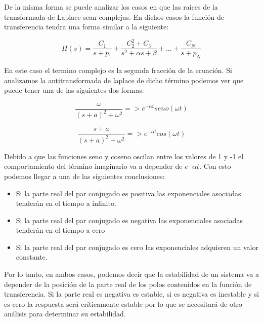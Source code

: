 De la misma forma se puede analizar los casos en que las raices de la transformada de Laplace sean complejas. En dichos casos la función de transferencia tendra una forma similar a la siguiente:

\begin{equation}
H(s)=\frac{C_1}{s+p_1}+\frac{C_2^2+C_3}{s^2+\alpha s+\beta}+...+\frac{C_N}{s+p_N}
\end{equation}

En este caso el termino complejo es la segunda fracción de la ecuación. Si analizamos la antitransformada de laplace de dicho término podemos ver que puede tener una de las siguientes dos formas:

\begin{equation}
\frac{\omega}{(s+a)^2+{\omega}^2} => e^{-\alpha t}seno(\omega t)
\end{equation}

\begin{equation}
\frac{s+a}{(s+a)^2+{\omega}^2} => e^{-\alpha t}cos(\omega t)
\end{equation}

Debido a que las funciones seno y coseno oscilan entre los valores de 1 y -1 el comportamiento del término imaginario va a depender de $e^-{\alpha t}$. Con esto podemos llegar a una de las siguientes conclusiones:

\begin{itemize}
\item Si la parte real del par conjugado es positiva las exponenciales asociadas tenderán en el tiempo a infinito.
\item Si la parte real del par conjugado es negativa las exponenciales asociadas tenderán en el tiempo a cero
\item Si la parte real del par conjugado es cero las exponenciales adquieren un valor constante.
\end{itemize}

Por lo tanto, en ambos casos, podemos decir que la estabilidad de un sistema va a depender de la posición de la parte real de los polos contenidos en la función de transferencia. Si la parte real es negativa es estable, si es negativa es inestable y si es cero la respuesta será críticamente estable por lo que se necesitará de otro análisis para determinar su estabilidad.